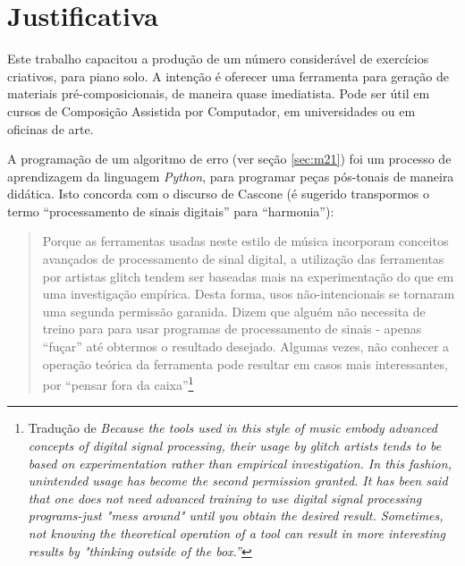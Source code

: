\section{Justificativa}\label{sec:justificativa}

Este trabalho capacitou a produção de um número considerável de exercícios criativos, para piano solo. A intenção é oferecer uma ferramenta para geração de materiais pré-composicionais, de maneira quase imediatista. Pode ser útil em cursos de Composição Assistida por Computador, em universidades ou em oficinas de arte. 

A programação de um algoritmo de erro (ver seção \ref{sec:m21}) foi um processo de aprendizagem da linguagem \emph{Python}, para programar peças pós-tonais de maneira didática. Isto concorda com  o discurso de Cascone (é sugerido transpormos o termo ``processamento de sinais digitais'' para ``harmonia''):
\ \\
\begin{quote}
Porque as ferramentas usadas neste estilo de música incorporam conceitos avançados de processamento de sinal digital, a utilização das ferramentas por artistas glitch tendem ser baseadas mais na experimentação do que em uma investigação empírica. Desta forma, usos não-intencionais se tornaram uma segunda permissão garanida. Dizem que alguém não necessita de treino para para usar programas de processamento de sinais - apenas ``fuçar'' até obtermos o resultado desejado. Algumas vezes, não conhecer a operação teórica da ferramenta pode resultar em casos mais interessantes, por ``pensar fora da caixa''\cite[p.~397]{cascone_aesthetics_2000}\footnote{Tradução de \emph{Because the tools used in this style of music embody advanced concepts of digital signal processing, their usage by glitch artists tends to be based on experimentation rather than empirical investigation. In this fashion, unintended usage has become the second permission granted. It has been said that one does not need advanced training to use digital signal processing programs-just "mess around" until you obtain the desired result. Sometimes, not knowing the theoretical operation of a tool can result in more interesting results by "thinking outside of the box.''}}
\end{quote}